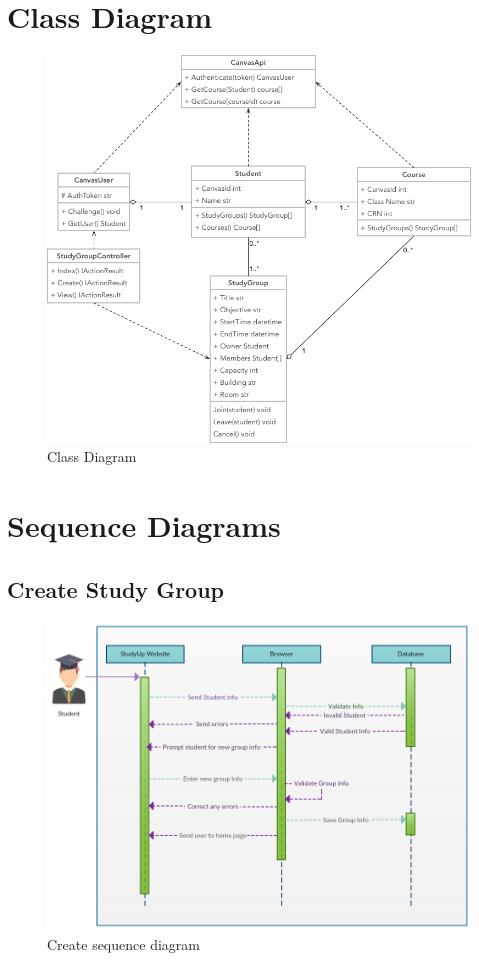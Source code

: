 \documentclass[12pt,letterpaper]{article}
\begin{document}
\section{Class Diagram}
\begin{figure}[!htb]
  \includegraphics[width=\linewidth]{StudyUp_Class_Diagram.png}
  \caption{Class Diagram}
  \label{class_diagram}
\end{figure}

\clearpage
\section{Sequence Diagrams}
\subsection{Create Study Group}
\begin{figure}[!htb]
  \includegraphics[width=\linewidth]{Create_Study_Group.png}
  \caption{Create sequence diagram}
  \label{create_sequence}
\end{figure}
\end{document}
